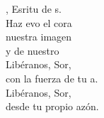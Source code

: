 \begin{cancion}%
	, Esritu de s. \\
	Haz evo el cora\\
	nuestra imagen\\
	y de nuestro \\
	Libéranos, Sor, \\
	con la fuerza de tu a.\\
	Libéranos, Sor, \\
	desde tu propio azón.\\
\end{cancion}%
